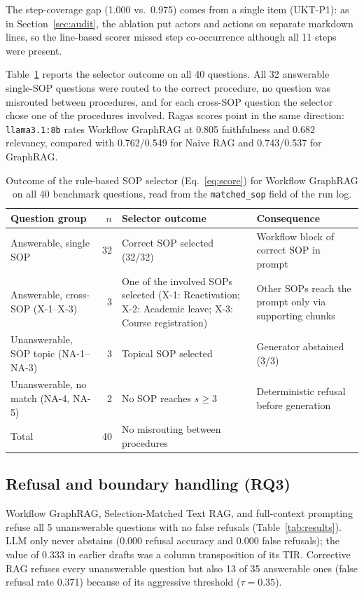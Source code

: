 \documentclass[preprint,10pt]{elsarticle}
\begin{document}
The step-coverage gap (1.000 vs.\ 0.975) comes from a single item (UKT-P1): as in Section~\ref{sec:audit}, the ablation put actors and actions on separate markdown lines, so the line-based scorer missed step co-occurrence although all 11 steps were present.

Table~\ref{tab:selection} reports the selector outcome on all 40 questions. All 32 answerable single-SOP questions were routed to the correct procedure, no question was misrouted between procedures, and for each cross-SOP question the selector chose one of the procedures involved. Ragas scores point in the same direction: \texttt{llama3.1:8b} rates Workflow GraphRAG at 0.805 faithfulness and 0.682 relevancy, compared with 0.762/0.549 for Naive RAG and 0.743/0.537 for GraphRAG.

\begin{table}[!htbp]
\centering
\caption{Outcome of the rule-based SOP selector (Eq.~\eqref{eq:score}) for Workflow GraphRAG on all 40 benchmark questions, read from the \texttt{matched\_sop} field of the run log.}
\label{tab:selection}
\small
\setlength{\tabcolsep}{4pt}
\begin{tabularx}{\textwidth}{>{\raggedright\arraybackslash}p{2.7cm} r >{\raggedright\arraybackslash}X >{\raggedright\arraybackslash}p{3.0cm}}
\toprule
Question group & $n$ & Selector outcome & Consequence \\
\midrule
Answerable, single SOP & 32 & Correct SOP selected (32/32) & Workflow block of correct SOP in prompt \\
Answerable, cross-SOP (X-1--X-3) & 3 & One of the involved SOPs selected (X-1: Reactivation; X-2: Academic leave; X-3: Course registration) & Other SOPs reach the prompt only via supporting chunks \\
Unanswerable, SOP topic (NA-1--NA-3) & 3 & Topical SOP selected & Generator abstained (3/3) \\
Unanswerable, no match (NA-4, NA-5) & 2 & No SOP reaches $s \geq 3$ & Deterministic refusal before generation \\
\midrule
Total & 40 & No misrouting between procedures & \\
\bottomrule
\end{tabularx}
\end{table}

\subsection{Refusal and boundary handling (RQ3)}
Workflow GraphRAG, Selection-Matched Text RAG, and full-context prompting refuse all 5 unanswerable questions with no false refusals (Table~\ref{tab:results}). LLM only never abstains (0.000 refusal accuracy and 0.000 false refusals); the value of 0.333 in earlier drafts was a column transposition of its TIR. Corrective RAG refuses every unanswerable question but also 13 of 35 answerable ones (false refusal rate 0.371) because of its aggressive threshold ($\tau=0.35$).
\end{document}
